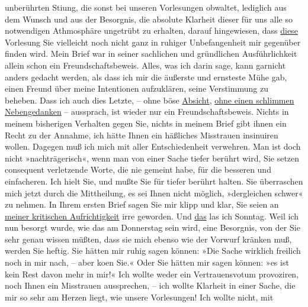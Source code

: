 \begin{ledgroupsized}[t]{13cm}
               unberührten Sti{\geminationm}ung, die sonst bei unseren Vorlesungen
               obwaltet, lediglich aus dem Wunsch und aus der Besorgnis, die absolute Klarheit
               dieser für uns alle so notwendigen Athmosphäre ungetrübt zu erhalten, darauf
               hingewiesen, dass \uline{diese} Vorlesung Sie vielleicht noch
               nicht ganz in ruhiger Unbefangenheit mir gegenüber finden wird. \pend
           \pstart
           Mein Brief war in seiner sachlichen und gründlichen Ausführlichkeit allein schon ein
               Freundschaftsbeweis. Alles, was ich darin sage, kann garnicht anders gedacht werden,
               als dass ich mir die äußerste und ernsteste Mühe gab, einen Freund über meine {\pb}Intentionen aufzuklären, seine
               Verstimmung zu beheben. Dass ich auch dies Letzte, – ohne böse \uline{Absicht}, \uline{ohne einen schlimmen
                  Nebengedanken} – aussprach, ist wieder nur ein Freundschaftsbeweis. Nichts in
               meinem bisherigen Verhalten gegen Sie, nichts in meinem Brief gibt ihnen ein Recht zu
               der Annahme, ich hätte Ihnen ein häßliches Misstrauen insinuiren wollen. Dagegen muß
               ich mich mit aller Entschiedenheit verwehren. \pend
           \pstart
           Man ist doch nicht »nachträgerisch«, wenn man von einer Sache tiefer berührt wird,
               Sie setzen consequent verletzende Worte, die  nie
               gemeint habe, für die besseren und einfacheren. \pend
           \pstart
           Ich hielt Sie, und mußte Sie für tiefer berührt halten. Sie überraschen mich jetzt
               durch die Mittheilung, es sei Ihnen nicht möglich, »dergleichen schwer« zu nehmen. \pend
           \pstart
           In Ihrem ersten Brief sagen Sie mir klipp und klar, Sie seien an \uline{meiner kritischen Aufrichtigkeit} irre geworden. Und \uline{das} las ich Sonntag. Weil ich nun besorgt
               wurde, wie das am Donnerstag sein wird, eine Besorgnis, von der Sie sehr
               genau wissen müßten, dass sie mich ebenso wie der Vorwurf kränken muß, werden Sie
               heftig. \pend
           \pstart
           Sie hätten mir ruhig sagen können: »Die Sache wirklich freilich noch in mir nach, –
               aber ko{\geminationm}en {\pb}Sie.« Oder Sie hätten mir sagen
               können: »es ist kein Rest davon mehr in mir!« Ich wollte weder ein Vertrauensvotum
               provoziren, noch Ihnen ein Misstrauen aussprechen, – ich wollte Klarheit in einer
               Sache, die mir so sehr am Herzen liegt, wie unsere Vorlesungen! Ich wollte nicht, mit

\end{ledgroupsized}
